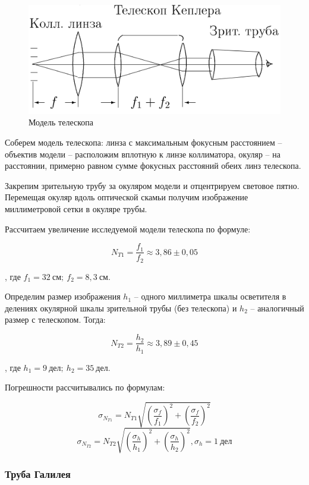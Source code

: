 \documentclass[a4paper,12pt]{article}
\begin{document}
\begin{figure} 
	\includegraphics[width=\linewidth]{fig3}
	\caption{Модель телескопа}
	\label{Kepler}
\end{figure}

Соберем модель телескопа: линза с максимальным фокусным расстоянием -- объектив модели -- расположим вплотную к линзе коллиматора, окуляр -- на расстоянии, примерно равном сумме фокусных расстояний обеих линз телескопа.

Закрепим зрительную трубу за окуляром модели и отцентрируем световое пятно. Перемещая окуляр вдоль оптической скамьи получим изображение миллиметровой сетки в окуляре трубы.

Рассчитаем увеличение исследуемой модели телескопа по формуле:

$$
N_{T1} = \frac{f_1}{f_2} \approx 3,86 \pm  0,05
$$

, где $f_1 = 32 \ см; \ f_2 = 8,3 \ см $.

Определим размер изображения $h_1$ -- одного миллиметра шкалы осветителя в делениях окулярной шкалы зрительной трубы (без телескопа) и $h_2$ -- аналогичный размер с телескопом. Тогда:

$$
N_{T2} = \frac{h_2}{h_1} \approx 3,89 \pm 0,45
$$

, где $h_1 = 9 \ дел; \ h_2 = 35 \ дел$.

Погрешности рассчитывались по формулам:

$$
\sigma_{N_{T1}} =N_{T1} \sqrt{ \left(\frac{ \sigma_f}{f_1}\right)^2 + \left( \frac{\sigma_f}{f_2}\right)^2 }
$$
$$
\sigma_{N_{T2}} =N_{T2} \sqrt{ \left(\frac{ \sigma_h}{h_1}\right)^2 + \left( \frac{\sigma_h}{h_2}\right)^2 } , \sigma_h = 1 \ дел
$$

\newpage

\subsubsection*{Труба Галилея}
\end{document}
